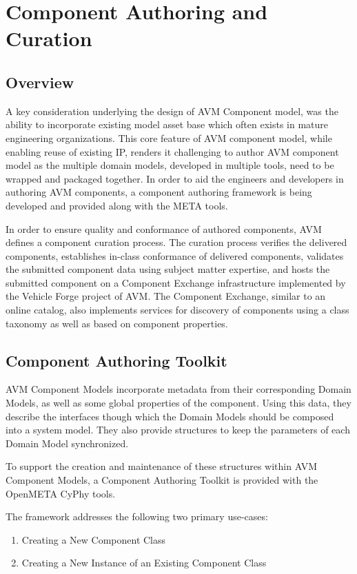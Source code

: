 \chapter{Component Authoring and Curation}

\section{Overview}
A key consideration underlying the design of AVM Component model, was the ability to incorporate existing model asset base which often exists in mature engineering organizations. This core feature of AVM component model, while enabling reuse of existing IP, renders it challenging to author AVM component model as the multiple domain models, developed in multiple tools, need to be wrapped and packaged together. In order to aid the engineers and developers in authoring AVM components, a component authoring framework is being developed and provided along with the META tools. 

In order to ensure quality and conformance of authored components, AVM defines a component curation process. The curation process verifies the delivered components, establishes in-class conformance of delivered components, validates the submitted component data using subject matter expertise, and hosts the submitted component on a Component Exchange infrastructure implemented by the Vehicle Forge project of AVM. The Component Exchange, similar to an online catalog, also implements services for discovery of components using a class taxonomy as well as based on component properties.


\section{Component Authoring Toolkit}
AVM Component Models incorporate metadata from their corresponding Domain Models, as well as some global properties of the component. Using this data, they describe the interfaces though which the Domain Models should be composed into a system model. They also provide structures to keep the parameters of each Domain Model synchronized.

To support the creation and maintenance of these structures within AVM Component Models, a Component Authoring Toolkit is provided with the OpenMETA CyPhy tools.

The framework addresses the following two primary use-cases:
\begin{enumerate}
\item{Creating a New Component Class}
\item{Creating a New Instance of an Existing Component Class}
\end{enumerate}

